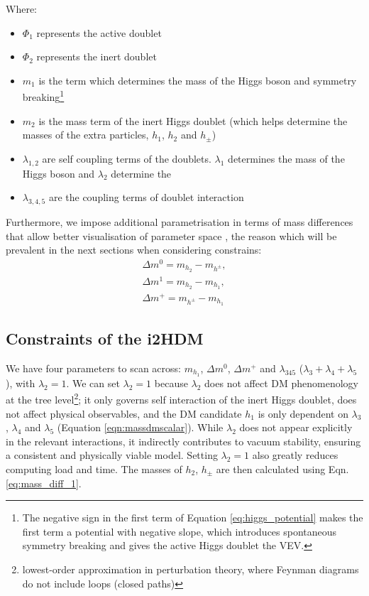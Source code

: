 \documentclass[12pt]{article}
\begin{document}
Where:
\begin{itemize}
    \item $\Phi_1$ represents the active doublet
    \item $\Phi_2$ represents the inert doublet
    \item $m_1$ is the term which determines the mass of the Higgs boson and symmetry breaking\footnote{The negative sign in the first term of Equation \ref{eq:higgs_potential} makes the first term a potential with negative slope, which introduces spontaneous symmetry breaking and gives the active Higgs doublet the VEV.}
    \item $m_2$ is the mass term of the inert Higgs doublet (which helps determine the masses of the extra particles, $h_1$, $h_2$ and $h_\pm$)
    \item $\lambda_{1, 2}$ are self coupling terms of the doublets. $\lambda_1$ determines the mass of the Higgs boson and $\lambda_2$ determine the 
    \item $\lambda_{3, 4, 5}$ are the coupling terms of doublet interaction
\end{itemize}
Furthermore, we impose additional parametrisation in terms of mass differences that allow better visualisation of parameter space \cite{Belyaev_2022}, the reason which will be prevalent in the next sections when considering constrains:
\begin{align}
\label{eq:mass_diff_1}
    \Delta m^{0} = m_{h_2} - m_{h^\pm},\\
    \Delta m^1 = m_{h_2} - m_{h_1},\\
    \Delta m^+ = m_{h^\pm} - m_{h_1}
\end{align}

\subsection{Constraints of the i2HDM}
We have four parameters to scan across: $m_{h_1}$, $\Delta m^0$, $\Delta m^+$ and $\lambda_{345}$ ($\lambda_3 + \lambda_4 + \lambda_5$), with $\lambda_2 = 1$. We can set $\lambda_2 = 1$ because $\lambda_2$ does not affect DM phenomenology at the tree level\footnote{lowest-order approximation in perturbation theory, where Feynman diagrams do not include loops (closed paths)}\cite{Belyaev:2016lok}; it only governs self interaction of the inert Higgs doublet, does not affect physical observables, and the DM candidate $h_1$ is only dependent on $\lambda_3$, $\lambda_4$ and $\lambda_5$ (Equation \ref{eqn:massdmscalar}). While $\lambda_2$ does not appear explicitly in the relevant interactions, it indirectly contributes to vacuum stability, ensuring a consistent and physically viable model. Setting $\lambda_2 = 1$ also greatly reduces computing load and time. The masses of $h_2$, $h_\pm$ are then calculated using Eqn. \ref{eq:mass_diff_1}.
\end{document}

